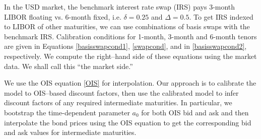 \documentclass[12pt,a4paper]{article}
\theoremstyle{plain}
\numberwithin{equation}{section}
\begin{document}
In the USD market, the benchmark interest rate swap (IRS) pays 3-month LIBOR floating vs. 6-month fixed, i.e. $\delta=0.25$ and $\Delta=0.5$. To get IRS indexed to LIBOR of other maturities, we can use combinations of basis swaps with the benchmark IRS.
Calibration conditions for 1-month, 3-month and 6-month tenors are given in Equations \eqref{basisswapcond1}, \eqref{swapcond}, and in \eqref{basisswapcond2}, respectively. We compute the right--hand side of these equations using the market data. We shall call this ``the market side.''

We use the OIS equation \eqref{OIS} for interpolation. Our approach is to calibrate the model to OIS--based discount factors, then use the calibrated model to infer discount factors of any required intermediate maturities. In particular, we bootstrap the time-dependent parameter $a_0$ for both OIS bid and ask and then interpolate the bond prices using the OIS equation to get the corresponding bid and ask values for intermediate maturities.
\end{document}
